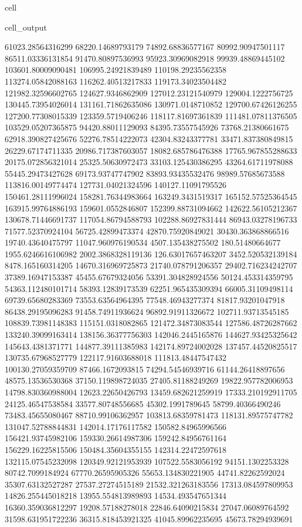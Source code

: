 \documentclass[letterpaper,10pt,english]{jupyterBook}
\begin{document}
\begin{sphinxuseclass}{cell}
\begin{sphinxVerbatimOutput}
\begin{sphinxuseclass}{cell_output}
\begin{sphinxVerbatim}[commandchars=\\\{\}]
61023.28564316299  68220.14689793179  74892.68836577167  80992.90947501117  86511.03336131854  91470.80897536993  95923.30969082918  99939.48869445102  103601.80009090481  106995.24921839489  110198.29235562358  113274.05842088163  116262.40513217833  119173.34023504482  121982.32596602765  124627.9346862909  127012.23121540979  129004.1222756725  130445.73954026014  131161.71862635086  130971.0148710852  129700.67426126255  127200.77308015339  123359.5719406246  118117.81697361839  111481.07811376505  103529.05207365875  94420.88011129093  84395.73557545926  73768.21380661675  62918.390827425676  52276.78514222073  42304.83243377781  33471.837380849815  26229.67174711335  20986.717387603057  18082.685786476388  17765.967855288633  20175.072856321014  25325.50630972473  33103.125430386295  43264.61711978088  55445.29473427628  69173.93747747902  83893.93435532476  98989.57685673588  113816.00149774474  127731.04021324596  140127.11091795526  150461.28111996024  158281.76344983664  163249.3431519317  165152.57525364545  163915.99764886193  159601.0552846807  152399.88731094662  142622.56105212367  130678.71446691737  117054.86794588793  102288.86927831444  86943.03278196733  71577.52370924104  56725.42899473374  42870.75920849021  30430.363868866516  19740.43640475797  11047.960976190534  4507.135438275502  180.51480664677  \PYGZhy{}1955.6246616106982  \PYGZhy{}2002.3868328119136  \PYGZhy{}126.63017657463207  3452.520532139184  8478.165160314205  14670.316969725873  21740.078791206357  29402.716234242707  37389.16947153387  45455.67679324056  53391.304828924556  
50124.453314359795  54363.112480101714  58393.12839173539  62251.965435309394  66005.31109498114  69739.65680283369  73553.63564964395  77548.46943277374  81817.93201047918  86438.29195096283  91458.74911936624  96892.91911326672  102711.93713545185  108839.73981148383  115151.0318082865  121472.34873083544  127586.48726287662  133240.39099163414  138156.36377756303  142046.2445165876  144627.93425325642  145643.4381371771  144877.39111385983  142174.89724002028  137457.44520825517  130735.67968527779  122117.91603688018  111813.48447547432  100130.27059359709  87466.1672093815  74294.54546939716  61144.26418897656  48575.13536530368  37150.119898724035  27405.81188249269  19822.957782006953  14798.830360988004  12623.22650426793  13459.682621259919  17333.210192911705  24125.46547538584  33577.80748556685  45302.1991789645  58799.40366490246  73483.45655080467  88710.99106362957  103813.68359781473  118131.89575747782  131047.52788844831  142014.17176117582  150582.84965996566  156421.93745982106  159330.26614987306  159242.84956761164  156229.16225815506  150484.35604355155  142314.22472597618  132115.07545232098  120349.92121953939  107522.5583056192  94151.1302253328  80742.7099184924  67770.26595905326  55653.134830221905  44741.82262592024  35307.63132527287  27537.27274515189  21532.321263183556  17313.084597809953  14826.255445018218  13955.554813989893  14534.493547651344  16360.359036812297  19208.57188278018  22846.64090215834  27047.06089764592  31598.631951722236  36315.818453921325  41045.89962235695  45673.78294939691  

\end{sphinxVerbatim}
\end{sphinxuseclass}
\end{sphinxVerbatimOutput}
\end{sphinxuseclass}
\end{document}
